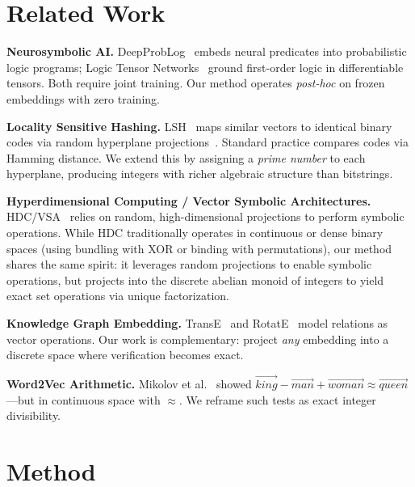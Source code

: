 \documentclass[10pt]{article}
\begin{document}
\section{Related Work}

\textbf{Neurosymbolic AI.}
DeepProbLog~\cite{manhaeve2018deepproblog} embeds neural predicates into probabilistic logic programs; Logic Tensor Networks~\cite{badreddine2022logic} ground first-order logic in differentiable tensors. Both require joint training. Our method operates \emph{post-hoc} on frozen embeddings with zero training.

\textbf{Locality Sensitive Hashing.}
LSH~\cite{indyk1998approximate} maps similar vectors to identical binary codes via random hyperplane projections~\cite{charikar2002similarity}. Standard practice compares codes via Hamming distance. We extend this by assigning a \emph{prime number} to each hyperplane, producing integers with richer algebraic structure than bitstrings.

\textbf{Hyperdimensional Computing / Vector Symbolic Architectures.}
HDC/VSA~\cite{kanerva2009hyperdimensional, plate1995holographic} relies on random, high-dimensional projections to perform symbolic operations. While HDC traditionally operates in continuous or dense binary spaces (using bundling with XOR or binding with permutations), our method shares the same spirit: it leverages random projections to enable symbolic operations, but projects into the discrete abelian monoid of integers to yield exact set operations via unique factorization.

\textbf{Knowledge Graph Embedding.}
TransE~\cite{bordes2013translating} and RotatE~\cite{sun2019rotate} model relations as vector operations. Our work is complementary: project \emph{any} embedding into a discrete space where verification becomes exact.

\textbf{Word2Vec Arithmetic.}
Mikolov et al.~\cite{mikolov2013efficient} showed $\vec{king} - \vec{man} + \vec{woman} \approx \vec{queen}$---but in continuous space with $\approx$. We reframe such tests as exact integer divisibility.

\section{Method}
\end{document}
